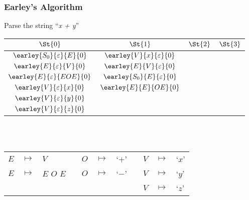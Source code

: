 \begin{frame}
	\frametitle{Earley's Algorithm}
	\centering
	Parse the string ``\emph{x + y}''\\
	\vspace{0.5cm}
	\begin{tabular}{|c|c|c|c|}
		\hline
		$\St{0}$                          & $\St{1}$ & $\St{2}$ & $\St{3}$ \\
		\hline
		$\earley{S_0}{\varepsilon}{E}{0}$ & $\earley{V}{x}{\varepsilon}{0}$   &  & \\
		$\earley{E}{\varepsilon}{V}{0}$   & $\earley{E}{V}{\varepsilon}{0}$   &  & \\
		$\earley{E}{\varepsilon}{EOE}{0}$ & $\earley{S_0}{E}{\varepsilon}{0}$ &  & \\
		$\earley{V}{\varepsilon}{x}{0}$   & $\earley{E}{E}{OE}{0}$            &  & \\
		$\earley{V}{\varepsilon}{y}{0}$   &                                   &  & \\
		$\earley{V}{\varepsilon}{z}{0}$   &                                   &  & \\
		\hline
	\end{tabular}

	\\~\\
	\vspace{0.5cm}
	\scriptsize
	\begin{tabular}{rclcrclcrcl}
		$E$ & $ \mapsto $ & $V$         && $O$ & $ \mapsto $ & `$+$' && $V$ & $ \mapsto $ & `$x$' \\
		$E$ & $ \mapsto $ & $E$ $O$ $E$ && $O$ & $ \mapsto $ & `$-$' && $V$ & $ \mapsto $ & `$y$' \\
		    &             &             &&     &             &       && $V$ & $ \mapsto $ & `$z$'
	\end{tabular}
\end{frame}

